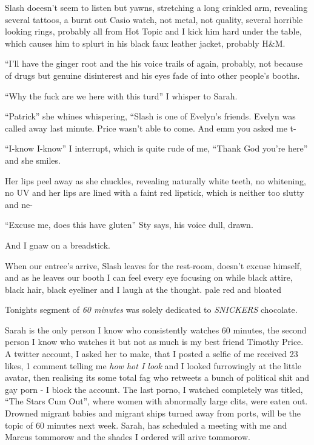 \documentclass[19pt,openany]{book}
\begin{document}
Slash doeesn't seem to listen but yawns, stretching a long
crinkled arm, revealing several tattoos, a burnt out Casio watch, not metal, not quality, several horrible looking rings, probably
all from Hot Topic
and I kick him hard under the table, which causes him to splurt in
his black faux leather jacket, probably H\&M.

``I'll have the ginger root and the his voice trails of again, probably, not because of drugs but genuine disinterest and his eyes fade of
into other people's booths.

``Why the fuck are we here with this turd'' I whisper to Sarah.

``Patrick'' she whines whispering, ``Slash is one of Evelyn's
friends. Evelyn was called away last minute. Price wasn't able
to come. And emm you asked me t-

``I-know I-know'' I interrupt, which is quite rude of me, ``Thank
God you're here'' and she smiles.

Her lips peel away as she chuckles, revealing naturally white teeth,
no whitening, no UV and her lips are lined
with a faint red lipstick, which
is neither too slutty and ne-

``Excuse me, does this have gluten'' Sty says, his voice dull,
drawn.

And I gnaw on a breadstick.

When our entree's arrive, Slash leaves for the rest-room,
doesn't excuse himself, and as he leaves our booth I can
feel every eye focusing on while black attire, black hair,
black eyeliner and I laugh at the thought.
pale red and bloated

Tonights segment of \textit{60 minutes} was solely
dedicated to \textit{SNICKERS} chocolate.

Sarah is the only person I know who consistently watches 60 minutes, the second person I know who watches it but not as much is my best friend Timothy Price. A twitter account, I asked her to make, that
I posted a selfie of me received 23 likes, 1 comment telling me
\textit{how hot I look} and I looked furrowingly at the little
avatar, then realising its some total fag who retweets
a bunch of political shit and gay porn - I block the account.
The last porno, I watched completely was titled, ``The Stars Cum Out'', where women with abnormally large clits, were eaten out. Drowned
migrant babies and migrant ships turned away from ports, will be
the topic of 60 minutes next week. Sarah, has scheduled a meeting
with me and Marcus tommorow and the shades I ordered will arive tommorow.
\end{document}
